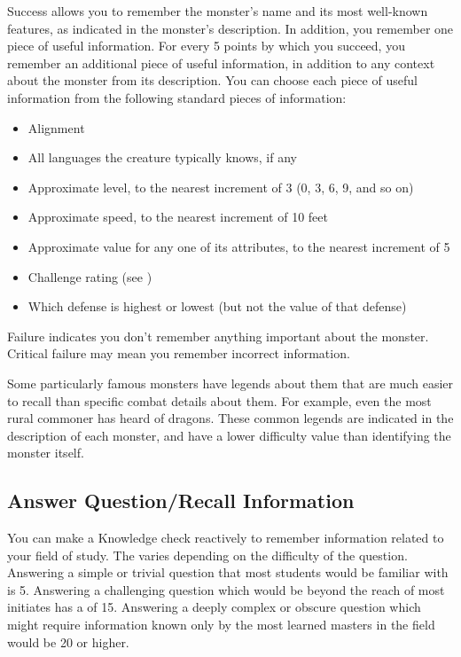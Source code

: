         Success allows you to remember the monster's name and its most well-known features, as indicated in the monster's description.
        In addition, you remember one piece of useful information.
        For every 5 points by which you succeed, you remember an additional piece of useful information, in addition to any context about the monster from its description.
        You can choose each piece of useful information from the following standard pieces of information:
        \begin{itemize}
            \item Alignment
            \item All languages the creature typically knows, if any
            \item Approximate level, to the nearest increment of 3 (0, 3, 6, 9, and so on)
            \item Approximate speed, to the nearest increment of 10 feet
            \item Approximate value for any one of its attributes, to the nearest increment of 5
            \item Challenge rating (see )
            \item Which defense is highest or lowest (but not the value of that defense)
        \end{itemize}

        Failure indicates you don't remember anything important about the monster.
        Critical failure may mean you remember incorrect information.

        Some particularly famous monsters have legends about them that are much easier to recall than specific combat details about them.
        For example, even the most rural commoner has heard of dragons.
        These common legends are indicated in the description of each monster, and have a lower difficulty value than identifying the monster itself.

    \subsection{Answer Question/Recall Information}
        You can make a Knowledge check reactively to remember information related to your field of study. The  varies depending on the difficulty of the question. Answering a simple or trivial question that most students would be familiar with is  5. Answering a challenging question which would be beyond the reach of most initiates has a  of 15. Answering a deeply complex or obscure question which might require information known only by the most learned masters in the field would be  20 or higher.

